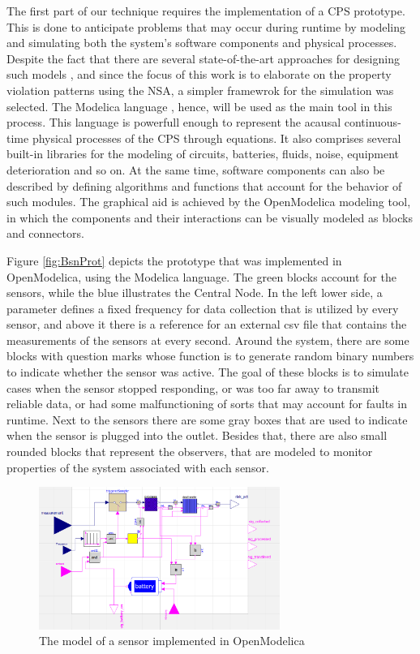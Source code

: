 The first part of our technique requires the implementation of a CPS prototype. This is done to anticipate problems that may occur during runtime by modeling and simulating both the system's software components and physical processes. Despite the fact that there are several state-of-the-art approaches for designing such models \cite{baras2019formal} \cite{deng2019modeling} \cite{bouskela2022formal}, and since the focus of this work is to elaborate on the property violation patterns using the NSA, a simpler framewrok for the simulation was selected. The Modelica language \cite{Modelica}, hence, will be used as the main tool in this process. This language is powerfull enough to represent the acausal continuous-time physical processes of the CPS through equations. It also comprises several built-in libraries for the modeling of circuits, batteries, fluids, noise, equipment deterioration and so on. At the same time, software components can also be described by defining algorithms and functions that account for the behavior of such modules. The graphical aid is achieved by the OpenModelica \cite{OpenModelica} modeling tool, in which the components and their interactions can be visually modeled as blocks and connectors.


Figure \ref{fig:BsnProt} depicts the prototype that was implemented in OpenModelica, using the Modelica language. The green blocks account for the sensors, while the blue illustrates the Central Node. In the left lower side, a parameter defines a fixed frequency for data collection that is utilized by every sensor, and above it there is a reference for an external csv file that contains the measurements of the sensors at every second. Around the system, there are some blocks with question marks whose function is to generate random binary numbers to indicate whether the sensor was active. The goal of these blocks is to simulate cases when the sensor stopped responding, or was too far away to transmit reliable data, or had some malfunctioning of sorts that may account for faults in runtime. Next to the sensors there are some gray boxes that are used to indicate when the sensor is plugged into the outlet. Besides that, there are also small rounded blocks that represent the observers, that are modeled to monitor properties of the system associated with each sensor.

\begin{figure}[!h]
	\centering
	\includegraphics[width=0.7\textwidth, keepaspectratio]{img/sensor_modelica.png}
	\caption{The model of a sensor implemented in OpenModelica}
	\label{fig:sensorProt}
\end{figure}

